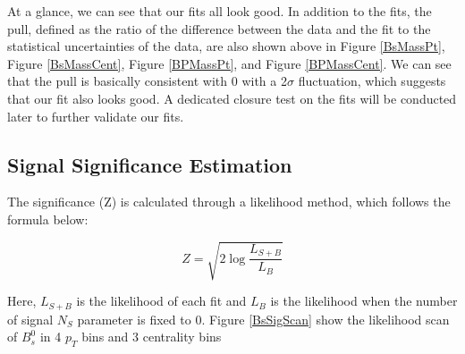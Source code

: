 At a glance, we can see that our fits all look good. In addition to the fits, the pull, defined as the ratio of the difference between the data and the fit to the statistical uncertainties of the data, are also shown above in Figure \ref{BsMassPt}, Figure \ref{BsMassCent}, Figure \ref{BPMassPt}, and Figure \ref{BPMassCent}. We can see that the pull is basically consistent with 0 with a 2$\sigma$ fluctuation, which suggests that our fit also looks good. A dedicated closure test on the fits will be conducted later to further validate our fits.

\subsection{Signal Significance Estimation}

The significance (Z) is calculated through a likelihood method, which follows the formula below:

\begin{equation}
Z=\sqrt{ 2 \log \frac{L_{S+B}}{L_B}}
\end{equation}

Here, $L_{S+B}$ is the likelihood of each fit and $L_B$ is the likelihood when the number of signal $N_S$ parameter is fixed to 0. Figure \ref{BsSigScan} show the likelihood scan of $B^0_s$ in 4 $p_T$ bins and 3 centrality bins

